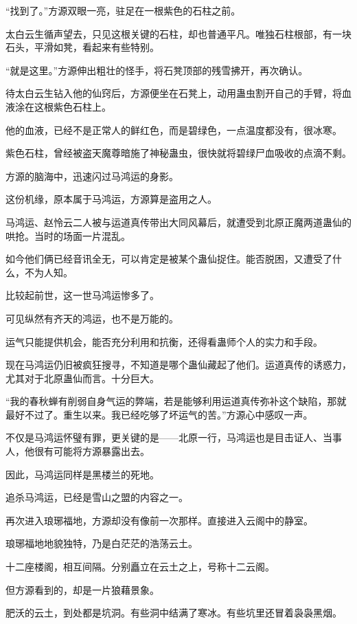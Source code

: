 
\begin{this_body}

“找到了。”方源双眼一亮，驻足在一根紫色的石柱之前。

太白云生循声望去，只见这根关键的石柱，却也普通平凡。唯独石柱根部，有一块石头，平滑如凳，看起来有些特别。

“就是这里。”方源伸出粗壮的怪手，将石凳顶部的残雪拂开，再次确认。

待太白云生钻入他的仙窍后，方源便坐在石凳上，动用蛊虫割开自己的手臂，将血液涂在这根紫色石柱上。

他的血液，已经不是正常人的鲜红色，而是碧绿色，一点温度都没有，很冰寒。

紫色石柱，曾经被盗天魔尊暗施了神秘蛊虫，很快就将碧绿尸血吸收的点滴不剩。

方源的脑海中，迅速闪过马鸿运的身影。

这份机缘，原本属于马鸿运，方源算是盗用之人。

马鸿运、赵怜云二人被与运道真传带出大同风幕后，就遭受到北原正魔两道蛊仙的哄抢。当时的场面一片混乱。

如今他们俩已经音讯全无，可以肯定是被某个蛊仙捉住。能否脱困，又遭受了什么，不为人知。

比较起前世，这一世马鸿运惨多了。

可见纵然有齐天的鸿运，也不是万能的。

运气只能提供机会，能否充分利用和抗衡，还得看蛊师个人的实力和手段。

现在马鸿运仍旧被疯狂搜寻，不知道是哪个蛊仙藏起了他们。运道真传的诱惑力，尤其对于北原蛊仙而言。十分巨大。

“我的春秋蝉有削弱自身气运的弊端，若是能够利用运道真传弥补这个缺陷，那就最好不过了。重生以来。我已经吃够了坏运气的苦。”方源心中感叹一声。

不仅是马鸿运怀璧有罪，更关键的是——北原一行，马鸿运也是目击证人、当事人，他很有可能将方源暴露出去。

因此，马鸿运同样是黑楼兰的死地。

追杀马鸿运，已经是雪山之盟的内容之一。

再次进入琅琊福地，方源却没有像前一次那样。直接进入云阁中的静室。

琅琊福地地貌独特，乃是白茫茫的浩荡云土。

十二座楼阁，相互间隔。分别矗立在云土之上，号称十二云阁。

但方源看到的，却是一片狼藉景象。

肥沃的云土，到处都是坑洞。有些洞中结满了寒冰。有些坑里还冒着袅袅黑烟。


\end{this_body}
